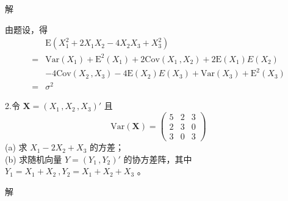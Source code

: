\documentclass[12pt,hyperref,]{ctexart}
\begin{document}
\vspace{1em}

\heiti

解

\songti

由题设，得 \begin{equation*}
\begin{aligned}
&\mathrm{E}(X_1^2+2X_1X_2-4X_2X_3+X_3^2) \\
=&\mathrm{Var}(X_1)+\mathrm{E}^2(X_1)+2\mathrm{Cov}(X_1\, ,X_2)+2\mathrm{E}(X_1)E(X_2) \\
&-4\mathrm{Cov}(X_2\, ,X_3)-4\mathrm{E}(X_2)E(X_3)+\mathrm{Var}(X_3)+\mathrm{E}^2(X_3) \\
=&\sigma^2
\end{aligned}
\end{equation*}

\vspace{3em}

\kaishu

2.令 \(\mathbf{X}=(X_1\, ,X_2\, ,X_3)'\) 且 \begin{equation*}
\mathrm{Var}(\mathbf{X})=
\begin{pmatrix}
5 & 2 & 3 \\
2 & 3 & 0 \\
3 & 0 & 3
\end{pmatrix}
\end{equation*}(a) 求 \(X_1-2X_2+X_3\) 的方差；\\
(b) 求随机向量 \(Y=(Y_1\, ,Y_2)'\) 的协方差阵，其中
\(Y_1=X_1+X_2\  ,Y_2=X_1+X_2+X_3\) 。

\vspace{1em}

\heiti

解

\songti
\end{document}
